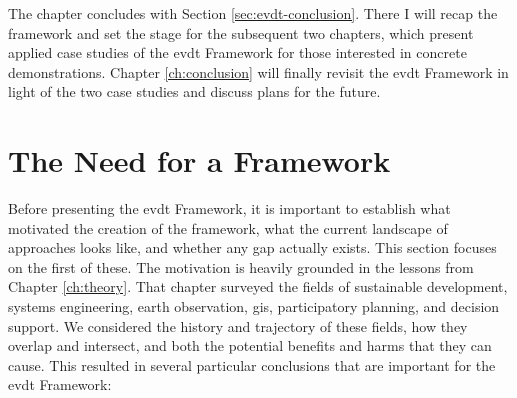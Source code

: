 The chapter concludes with Section \ref{sec:evdt-conclusion}. There I will recap the framework and set the stage for the subsequent two chapters, which present applied case studies of the \ac{evdt} Framework for those interested in concrete demonstrations. Chapter \ref{ch:conclusion} will finally revisit the \ac{evdt} Framework in light of the two case studies and discuss plans for the future. 

\section{The Need for a Framework} \label{sec:need}

Before presenting the \ac{evdt} Framework, it is important to establish what motivated the creation of the framework, what the current landscape of approaches looks like, and whether any gap actually exists. This section focuses on the first of these. The motivation is heavily grounded in the lessons from Chapter \ref{ch:theory}. That chapter surveyed the fields of sustainable development, systems engineering, earth observation, \ac{gis}, participatory planning, and decision support. We considered the history and trajectory of these fields, how they overlap and intersect, and both the potential benefits and harms that they can cause. This resulted in several particular conclusions that are important for the \ac{evdt} Framework:


